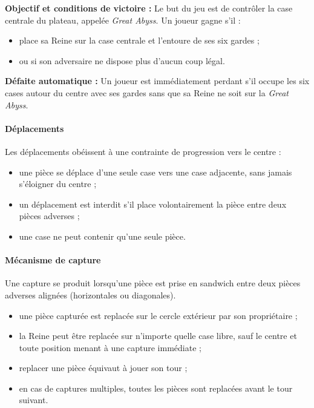 \documentclass[9pt]{extarticle} %
\begin{document}
\textbf{Objectif et conditions de victoire :}  
Le but du jeu est de contrôler la case centrale du plateau, appelée \textit{Great Abyss}. Un joueur gagne s’il :
\begin{itemize}
    \item place sa Reine sur la case centrale et l’entoure de ses six gardes ;
    \item ou si son adversaire ne dispose plus d’aucun coup légal.
\end{itemize}

\textbf{Défaite automatique :}  
Un joueur est immédiatement perdant s’il occupe les six cases autour du centre avec ses gardes sans que sa Reine ne soit sur la \textit{Great Abyss}.

\paragraph{\textbf{Déplacements}}
Les déplacements obéissent à une contrainte de progression vers le centre :
\begin{itemize}
    \item une pièce se déplace d’une seule case vers une case adjacente, sans jamais s’éloigner du centre ;
    \item un déplacement est interdit s’il place volontairement la pièce entre deux pièces adverses ;
    \item une case ne peut contenir qu’une seule pièce.
\end{itemize}

\paragraph{\textbf{Mécanisme de capture}}
Une capture se produit lorsqu’une pièce est prise en sandwich entre deux pièces adverses alignées (horizontales ou diagonales).
\begin{itemize}
    \item une pièce capturée est replacée sur le cercle extérieur par son propriétaire ;
    \item la Reine peut être replacée sur n’importe quelle case libre, sauf le centre et toute position menant à une capture immédiate ;
    \item replacer une pièce équivaut à jouer son tour ;
    \item en cas de captures multiples, toutes les pièces sont replacées avant le tour suivant.
\end{itemize}
\end{document}
